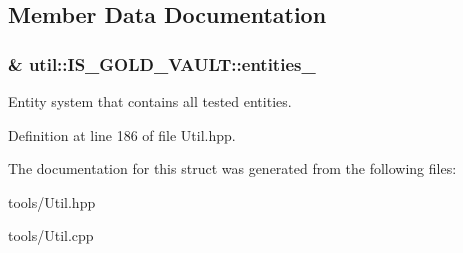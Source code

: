 \subsection{Member Data Documentation}
\subsubsection[{\texorpdfstring{entities\+\_\+}{entities_}}]{\& util\+::\+I\+S\+\_\+\+G\+O\+L\+D\+\_\+\+V\+A\+U\+L\+T\+::entities\+\_\+\hspace{0.3cm}{\ttfamily [private]}}\hypertarget{structutil_1_1_i_s___g_o_l_d___v_a_u_l_t_a69fd1690e96bd7d1d5faaa8972087497}{}\label{structutil_1_1_i_s___g_o_l_d___v_a_u_l_t_a69fd1690e96bd7d1d5faaa8972087497}


Entity system that contains all tested entities. 



Definition at line 186 of file Util.\+hpp.



The documentation for this struct was generated from the following files\+:\begin{DoxyCompactItemize}
\item 
tools/Util.\+hpp\item 
tools/Util.\+cpp\end{DoxyCompactItemize}
